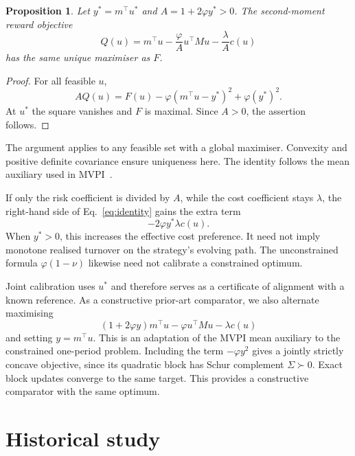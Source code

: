 \documentclass[sigconf,review]{acmart}
\newtheorem{proposition}{Proposition}
\begin{document}
\begin{proposition}\label{prop:joint}
Let $y^*=m^\top u^*$ and $A=1+2\varphi y^*>0$. The second-moment reward objective
\begin{equation}
 Q(u)=m^\top u-\frac{\varphi}{A}u^\top M u-\frac{\lambda}{A}c(u)
\end{equation}
has the same unique maximiser as $F$.
\end{proposition}
\begin{proof}
For all feasible $u$,
\begin{equation}\label{eq:identity}
 AQ(u)=F(u)-\varphi(m^\top u-y^*)^2+\varphi(y^*)^2.
\end{equation}
At $u^*$ the square vanishes and $F$ is maximal. Since $A>0$, the assertion follows.
\end{proof}
The argument applies to any feasible set with a global maximiser. Convexity and positive definite covariance ensure uniqueness here. The identity follows the mean auxiliary used in MVPI\ \cite{zhang2021}.

If only the risk coefficient is divided by $A$, while the cost coefficient stays $\lambda$, the right-hand side of Eq.\ \eqref{eq:identity} gains the extra term
\begin{equation}\label{eq:costdistortion}
 -2\varphi y^*\lambda c(u).
\end{equation}
When $y^*>0$, this increases the effective cost preference. It need not imply monotone realised turnover on the strategy's evolving path. The unconstrained formula $\varphi(1-\nu)$ likewise need not calibrate a constrained optimum.

Joint calibration uses $u^*$ and therefore serves as a certificate of alignment with a known reference. As a constructive prior-art comparator, we also alternate maximising
\begin{equation}
 (1+2\varphi y)m^\top u-\varphi u^\top Mu-\lambda c(u)
\end{equation}
and setting $y=m^\top u$. This is an adaptation of the MVPI mean auxiliary to the constrained one-period problem. Including the term $-\varphi y^2$ gives a jointly strictly concave objective, since its quadratic block has Schur complement $\Sigma\succ0$. Exact block updates converge to the same target. This provides a constructive comparator with the same optimum.

\section{Historical study}
\end{document}
